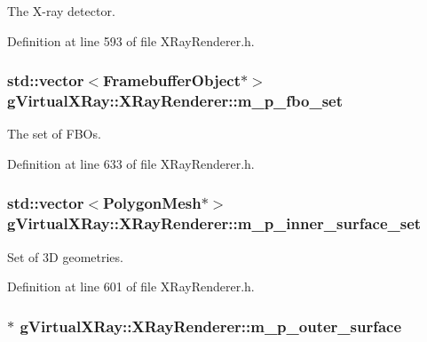 The X-\/ray detector. 



Definition at line 593 of file XRayRenderer.h.

\hypertarget{classg_virtual_x_ray_1_1_x_ray_renderer_ac3df573e0519dd9809dbf5e7e762f796}{
\subsubsection[{m\_\-p\_\-fbo\_\-set}]{\setlength{\rightskip}{0pt plus 5cm}std::vector$<${\bf FramebufferObject}$\ast$$>$ {\bf gVirtualXRay::XRayRenderer::m\_\-p\_\-fbo\_\-set}}}
\label{classg_virtual_x_ray_1_1_x_ray_renderer_ac3df573e0519dd9809dbf5e7e762f796}


The set of FBOs. 



Definition at line 633 of file XRayRenderer.h.

\hypertarget{classg_virtual_x_ray_1_1_x_ray_renderer_a18d3b60ab79b39221526a490935e955f}{
\subsubsection[{m\_\-p\_\-inner\_\-surface\_\-set}]{\setlength{\rightskip}{0pt plus 5cm}std::vector$<${\bf PolygonMesh}$\ast$$>$ {\bf gVirtualXRay::XRayRenderer::m\_\-p\_\-inner\_\-surface\_\-set}}}
\label{classg_virtual_x_ray_1_1_x_ray_renderer_a18d3b60ab79b39221526a490935e955f}


Set of 3D geometries. 



Definition at line 601 of file XRayRenderer.h.

\hypertarget{classg_virtual_x_ray_1_1_x_ray_renderer_a4d31028c769154394e7815f39c164bc7}{
\subsubsection[{m\_\-p\_\-outer\_\-surface}]{$\ast$ {\bf gVirtualXRay::XRayRenderer::m\_\-p\_\-outer\_\-surface}}}
\label{classg_virtual_x_ray_1_1_x_ray_renderer_a4d31028c769154394e7815f39c164bc7}


